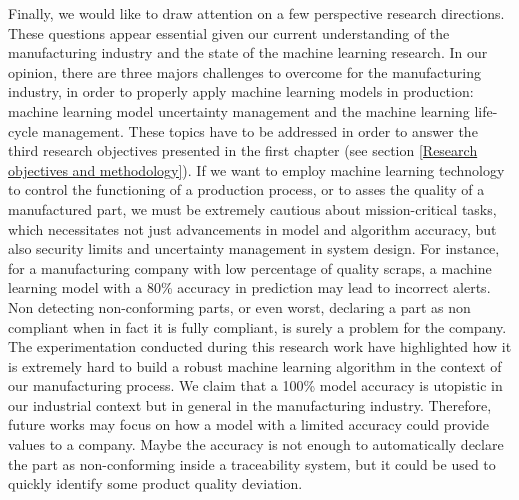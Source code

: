 Finally, we would like to draw attention on a few perspective research directions. These questions appear essential given our current understanding of the manufacturing industry and the state of the machine learning research. In our opinion, there are three majors challenges to overcome for the manufacturing industry, in order to properly apply machine learning models in production: machine learning model uncertainty management and the machine learning life-cycle management. These topics have to be addressed in order to answer the third research objectives presented in the first chapter (see section \ref{Research objectives and methodology}).   
If we want to employ machine learning technology to control the functioning of a production process, or to asses the quality of a manufactured part, we must be extremely cautious about mission-critical tasks, which necessitates not just advancements in model and algorithm accuracy, but also security limits and uncertainty management in system design. For instance, for a manufacturing company with low percentage of quality scraps, a machine learning model with a 80\% accuracy in prediction may lead to incorrect alerts. Non detecting non-conforming parts, or even worst, declaring a part as non compliant when in fact it is fully compliant, is surely a problem for the company. 
The experimentation conducted during this research work have highlighted how it is extremely hard to build a robust machine learning algorithm in the context of our manufacturing process. We claim that a 100\% model accuracy is utopistic in our industrial context but in general in the manufacturing industry. Therefore, future works may focus on how a model with a limited accuracy could provide values to a company. Maybe the accuracy is not enough to automatically declare the part as non-conforming inside a traceability system, but it could be used to quickly identify some product quality deviation.

